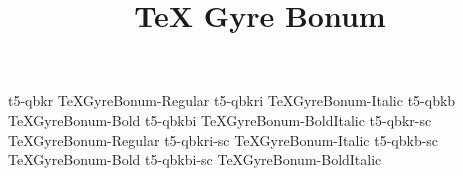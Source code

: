 \documentclass[test]{vnsample}
\title{TeX Gyre Bonum}
\begin{document}
\begin{shortsample}
    {t5-qbkr}     {TeXGyreBonum-Regular}
   {t5-qbkri}    {TeXGyreBonum-Italic}
    {t5-qbkb}     {TeXGyreBonum-Bold}
   {t5-qbkbi}    {TeXGyreBonum-BoldItalic}
   {t5-qbkr-sc}  {TeXGyreBonum-Regular}
 {t5-qbkri-sc} {TeXGyreBonum-Italic}
   {t5-qbkb-sc}  {TeXGyreBonum-Bold}
 {t5-qbkbi-sc} {TeXGyreBonum-BoldItalic}
\end{shortsample}
\end{document}
